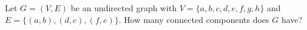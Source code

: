\begin{prob}
    Let $G = (V, E)$ be an undirected graph with $V = \{a, b, c, d, e, f, g, h\}$
    and $E = \{(a, b), (d, c), (f, e)\}$. How many connected components does $G$ have?


\end{prob}
